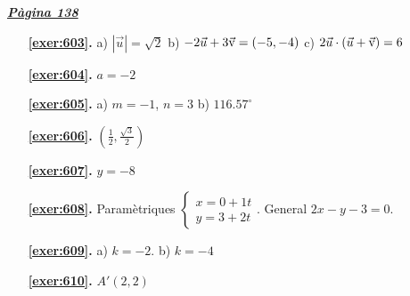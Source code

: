 \hyperlink{page.138}{\textbf{\em Pàgina 138}}
\begin{enumerate}
\item[\fontfamily{phv}\selectfont\color{blue}\textbf{\ref{exer:603}. }] \label{ans:603} 
a) $|\vec u|=\sqrt {2}$ b) $-2\vec u + 3\vec{\mathrm{v}} =(-5,-4)$ c) $2\vec u \cdot (\vec u + \vec{\mathrm{v}} )=6$
 \end{enumerate}
\begin{enumerate}
\item[\fontfamily{phv}\selectfont\color{blue}\textbf{\ref{exer:604}. }] \label{ans:604} 
 $a=-2$
\item[\fontfamily{phv}\selectfont\color{blue}\textbf{\ref{exer:605}. }] \label{ans:605} 
a) $m=-1$, $n=3$ b) $116.57^\circ $
\item[\fontfamily{phv}\selectfont\color{blue}\textbf{\ref{exer:606}. }] \label{ans:606} 
$(\frac {1}{2}, \frac {\sqrt {3}}{2})$
\item[\fontfamily{phv}\selectfont\color{blue}\textbf{\ref{exer:607}. }] \label{ans:607} 
$y=-8$
\item[\fontfamily{phv}\selectfont\color{blue}\textbf{\ref{exer:608}. }] \label{ans:608} 
Paramètriques $\left \{\begin {array}{l} x=0+1t \\ y=3+2t \end {array}\right .$. General $2x-y-3=0$.
\item[\fontfamily{phv}\selectfont\color{blue}\textbf{\ref{exer:609}. }] \label{ans:609} 
a) $k=-2$. b) $k=-4$
\item[\fontfamily{phv}\selectfont\color{blue}\textbf{\ref{exer:610}. }] \label{ans:610} 
$A'(2,2)$
 \end{enumerate}
\vspace{0.3cm}


